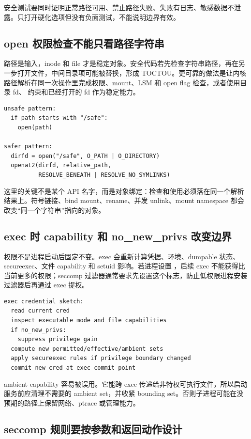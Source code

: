安全测试要同时证明正常路径可用、禁止路径失败、失败有日志、敏感数据不泄露。只打开硬化选项但没有负面测试，不能说明边界有效。

\subsection{open 权限检查不能只看路径字符串}

路径是输入，inode 和 file 才是稳定对象。安全代码若先检查字符串路径，再在另一步打开文件，中间目录项可能被替换，形成 TOCTOU。更可靠的做法是让内核路径解析在同一次操作里完成权限、mount、LSM 和 open flag 检查，或者使用目录 fd、 约束和已经打开的 fd 作为稳定能力。

\begin{lstlisting}
unsafe pattern:
  if path starts with "/safe":
    open(path)

safer pattern:
  dirfd = open("/safe", O_PATH | O_DIRECTORY)
  openat2(dirfd, relative_path,
          RESOLVE_BENEATH | RESOLVE_NO_SYMLINKS)
\end{lstlisting}

这里的关键不是某个 API 名字，而是对象绑定：检查和使用必须落在同一个解析结果上。符号链接、bind mount、rename、并发 unlink、mount namespace 都会改变“同一个字符串”指向的对象。

\subsection{exec 时 capability 和 no\_new\_privs 改变边界}

权限不是进程启动后固定不变。exec 会重新计算凭据、环境、dumpable 状态、secureexec、文件 capability 和 setuid 影响。若进程设置 ，后续 exec 不能获得比当前更多的权限；seccomp 过滤器通常要求先设置这个标志，防止低权限进程安装过滤器后再通过 exec 提权。

\begin{lstlisting}
exec credential sketch:
  read current cred
  inspect executable mode and file capabilities
  if no_new_privs:
    suppress privilege gain
  compute new permitted/effective/ambient sets
  apply secureexec rules if privilege boundary changed
  commit new cred at exec commit point
\end{lstlisting}

ambient capability 容易被误用。它能跨 exec 传递给非特权可执行文件，所以启动服务前应清理不需要的 ambient set，并收紧 bounding set。否则子进程可能在没预期的路径上保留网络、ptrace 或管理能力。

\subsection{seccomp 规则要按参数和返回动作设计}

